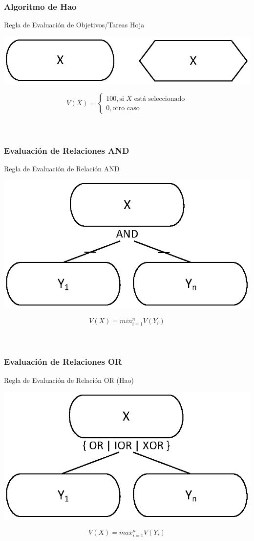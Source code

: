 \documentclass[handout,slidestop,xcolor=pst,dvips,blue]{beamer}
\begin{document}
\begin{frame}[c]
	\frametitle{Algoritmo de Hao}
	\begin{block}{Regla de Evaluación de Objetivos/Tareas Hoja}
		\begin{center}
			\includegraphics[width=0.5\linewidth,keepaspectratio=true]{images/influences/leafGoal.eps}
		\end{center}
		\begin{equation*}
		V(X) =
		\begin{cases}
		100, \text{si\ } X \text{\ está seleccionado} \\
		0, \text{otro caso}
		\end{cases}
		\end{equation*}
		\ \\ \ \\
	\end{block}
\end{frame}

\begin{frame}[c]
	\frametitle{Evaluación de Relaciones AND}
	\begin{block}{Regla de Evaluación de Relación AND}
		\begin{center}
			\includegraphics[width=0.4\linewidth,keepaspectratio=true]{images/influences/andRelationship.eps}
		\end{center}
		\begin{equation*}
		V(X) = min_{i=1}^{n} V(Y_{i})
		\end{equation*}
		\ \\ \ \\
	\end{block}
\end{frame}

\begin{frame}[c]
	\frametitle{Evaluación de Relaciones OR}
	\begin{block}{Regla de Evaluación de Relación OR (Hao)}
		\begin{center}
			\includegraphics[width=0.4\linewidth,keepaspectratio=true]{images/influences/orRelationship.eps}
		\end{center}
		\begin{equation*}
		V(X) = max_{i=1}^{n} V(Y_{i})
		\end{equation*}
		\ \\ \ \\
	\end{block}
\end{frame}
\end{document}
